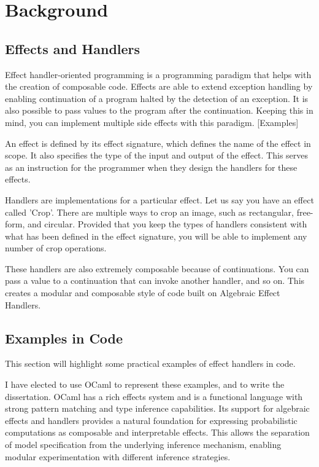 \documentclass[logo,bsc,singlespacing,parskip,online]{infthesis}
\begin{document}
\chapter{Background}

\section{Effects and Handlers}

Effect handler-oriented programming is a programming paradigm that helps with the creation of composable code. Effects are able to extend exception handling by enabling continuation of a program halted by the detection of an exception. It is also possible to pass values to the program after the continuation. Keeping this in mind, you can implement multiple side effects with this paradigm. [Examples]

An effect is defined by its effect signature, which defines the name of the effect in scope. It also specifies the type of the input and output of the effect. This serves as an instruction for the programmer when they design the handlers for these effects. 

Handlers are implementations for a particular effect. Let us say you have an effect called 'Crop'. There are multiple ways to crop an image, such as rectangular, free-form, and circular. Provided that you keep the types of handlers consistent with what has been defined in the effect signature, you will be able to implement any number of crop operations.

These handlers are also extremely composable because of continuations. You can pass a value to a continuation that can invoke another handler, and so on. This creates a modular and composable style of code built on Algebraic Effect Handlers. 

\section{Examples in Code}

This section will highlight some practical examples of effect handlers in code. 

I have elected to use OCaml to represent these examples, and to write the dissertation. OCaml has a rich effects system and is a functional language with strong pattern matching and type inference capabilities. Its support for algebraic effects and handlers provides a natural foundation for expressing probabilistic computations as composable and interpretable effects. This allows the separation of model specification from the underlying inference mechanism, enabling modular experimentation with different inference strategies. 
\end{document}
